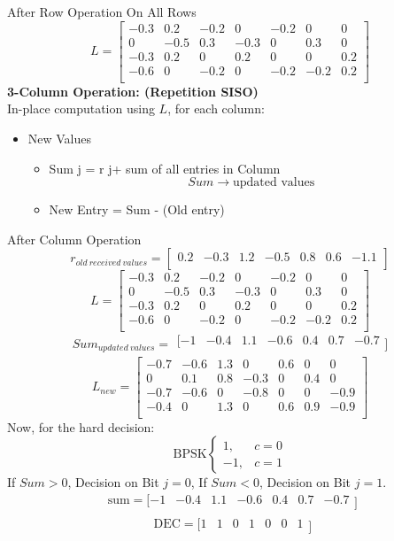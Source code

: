After Row Operation On All Rows
\[ L=\left[\begin{matrix}-0.3&0.2&-0.2&0&-0.2&0&0\\0&-0.5&0.3&-0.3&0&0.3&0\\-0.3&0.2&0&0.2&0&0&0.2\\-0.6&0&-0.2&0&-0.2&-0.2&0.2\\\end{matrix}\right] \]
\textbf{3-Column Operation: (Repetition SISO)} \\
In-place computation using $L$, for each column:
\begin{itemize}
    \item New Values
    \begin{itemize}
        \item Sum j = r j+ sum of all entries in Column \[ Sum \rightarrow \text{updated values} \]
        \item New Entry = Sum - (Old entry)
    \end{itemize}
\end{itemize}
After Column Operation
\[ r_{old\ received\ values}=[\begin{matrix}0.2&-0.3&1.2&-0.5&0.8&0.6&-1.1\\\end{matrix}] \]
\[ L=\left[\begin{matrix}-0.3&0.2&-0.2&0&-0.2&0&0\\0&-0.5&0.3&-0.3&0&0.3&0\\-0.3&0.2&0&0.2&0&0&0.2\\-0.6&0&-0.2&0&-0.2&-0.2&0.2\\\end{matrix}\right] \]
\[ {Sum}_{updated\ values} = \begin{matrix} [-1&-0.4&1.1&-0.6&0.4&0.7&-0.7\\\end{matrix}] \]
\[ L_{new}=\left[\begin{matrix}-0.7&-0.6&1.3&0&0.6&0&0\\0&0.1&0.8&-0.3&0&0.4&0\\-0.7&-0.6&0&-0.8&0&0&-0.9\\-0.4&0&1.3&0&0.6&0.9&-0.9\\\end{matrix}\right] \]
Now, for the hard decision:
\begin{equation*}
    \text{BPSK}
    \begin{cases}
        1, & c=0 \\
        -1, & c=1
    \end{cases}
\end{equation*}
If $Sum > 0$, Decision on Bit $j = 0$, If $Sum < 0$, Decision on Bit $j = 1$.
\[ \begin{matrix}\text{sum}=[-1&-0.4&1.1&-0.6&0.4&0.7&-0.7\\\end{matrix}] \]
\[ \begin{matrix}\text{DEC}=[1&1&0&1&0&0&1\\\end{matrix}] \]

